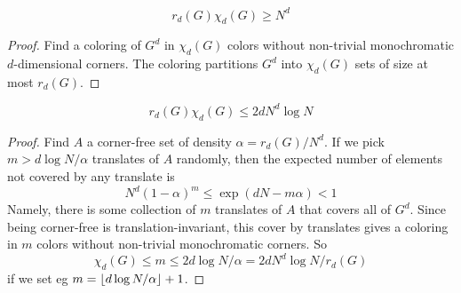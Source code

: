 \begin{lemma}
  \label{lem:corner-num-lower}

  $$r_d(G) \chi_d(G) \ge N^d$$
\end{lemma}
\begin{proof}

  Find a coloring of $G^d$ in $\chi_d(G)$ colors without non-trivial monochromatic $d$-dimensional corners. The coloring partitions $G^d$ into $\chi_d(G)$ sets of size at most $r_d(G)$.
\end{proof}

\begin{lemma}
  \label{lem:corner-num-upper}

  $$r_d(G) \chi_d(G) \le 2d N^d \log N$$
\end{lemma}
\begin{proof}

  Find $A$ a corner-free set of density $\alpha = r_d(G)/N^d$. If we pick $m > d\log N/\alpha$ translates of $A$ randomly, then the expected number of elements not covered by any translate is
  $$N^d(1 - \alpha)^m \le \exp(dN - m\alpha) < 1$$
  Namely, there is some collection of $m$ translates of $A$ that covers all of $G^d$. Since being corner-free is translation-invariant, this cover by translates gives a coloring in $m$ colors without non-trivial monochromatic corners. So
  $$\chi_d(G) \le m \le 2d \log N/\alpha = 2d N^d \log N/r_d(G)$$
  if we set eg $m = \left\lfloor d\log N/\alpha\right\rfloor + 1$.
\end{proof}
